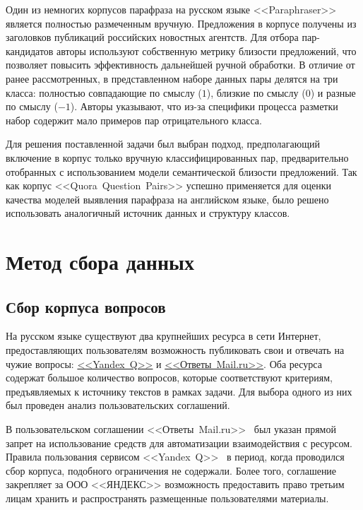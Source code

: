 \documentclass[a4paper,14pt]{extarticle}
\begin{document}
Один из немногих корпусов парафраза на русском языке \mbox{<<Paraphraser>>}~\autocite{pivovarova2017paraphraser} является полностью размеченным вручную. Предложения в корпусе получены из заголовков публикаций российских новостных агентств.
Для отбора пар-кандидатов авторы используют собственную метрику близости предложений, что позволяет повысить эффективность дальнейшей ручной обработки.
В отличие от ранее рассмотренных, в представленном наборе данных пары делятся на три класса: полностью совпадающие по смыслу ($1$), близкие по смыслу ($0$) и разные по смыслу ($-1$).
Авторы указывают, что из-за специфики процесса разметки набор содержит мало примеров пар отрицательного класса.

Для решения поставленной задачи был выбран подход, предполагающий включение в корпус только вручную классифицированных пар, предварительно отобранных с использованием модели семантической близости предложений.
Так как корпус \mbox{<<Quora Question Pairs>>} успешно применяется для оценки качества моделей выявления парафраза на английском языке, было решено использовать аналогичный источник данных и структуру классов.

\section{Метод сбора данных}
\subsection{Сбор корпуса вопросов}
На русском языке существуют два крупнейших ресурса в сети Интернет, предоставляющих пользователям возможность публиковать свои и отвечать на чужие вопросы: \href{https://yandex.ru/q/}{\mbox{<<Yandex Q>>}} и \href{https://otvet.mail.ru/}{\mbox{<<Ответы Mail.ru>>}}.
Оба ресурса содержат большое количество вопросов, которые соответствуют критериям, предъявляемых к источнику текстов в рамках задачи.
Для выбора одного из них был проведен анализ пользовательских соглашений.

В пользовательском соглашении \mbox{<<Ответы Mail.ru>>}~\autocite{mail_legal} был указан прямой запрет на использование средств для автоматизации взаимодействия с ресурсом.\\
Правила пользования сервисом \mbox{<<Yandex Q>>}~\autocite{yandex_legal} в период, когда проводился сбор корпуса, подобного ограничения не содержали.
Более того, соглашение закрепляет за \mbox{ООО} \mbox{<<ЯНДЕКС>>} возможность предоставить право третьим лицам хранить и распространять размещенные пользователями материалы.
\end{document}
